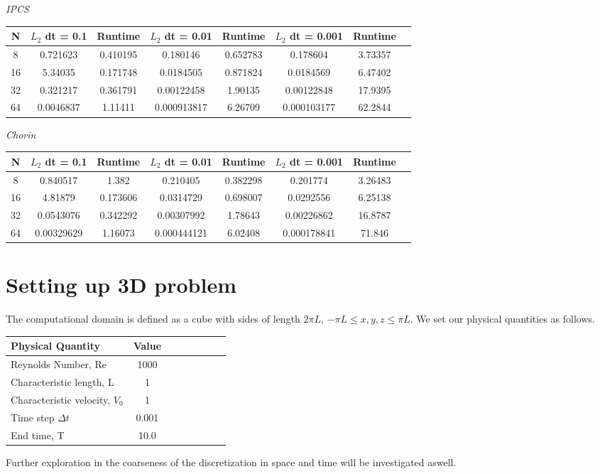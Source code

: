 \documentclass[a4paper,norsk]{article}
\begin{document}
\textit{IPCS}
\begin{table}[ht]
\centering
\begin{tabular}{c|ccccccc}
\hline
\rowcolor{LightCyan}
N  &  $L_2$ dt = 0.1 & Runtime & $L_2$ dt = 0.01 & Runtime  & $L_2$ dt = 0.001  & Runtime\\
\hline
8  & 0.721623  & 0.410195 & 0.180146    & 0.652783 & 0.178604    & 3.73357 \\ \hline
\rowcolor{LightCyan}
16 & 5.34035   & 0.171748 & 0.0184505   & 0.871824 & 0.0184569   & 6.47402 \\ \hline
32 & 0.321217  & 0.361791 & 0.00122458  & 1.90135  & 0.00122848  & 17.9395 \\ \hline
\rowcolor{LightCyan}
64 & 0.0046837 & 1.11411  & 0.000913817 & 6.26709  & 0.000103177 & 62.2844 \\
\hline
\end{tabular}
\end{table}

\textit{Chorin}

\begin{table}[ht]
\centering
\begin{tabular}{c|ccccccc}
\hline
\rowcolor{LightCyan}
N  &  $L_2$ dt = 0.1 & Runtime & $L_2$ dt = 0.01 & Runtime  & $L_2$ dt = 0.001  & Runtime\\
\hline
8  & 0.840517   & 1.382    & 0.210405    & 0.382298 & 0.201774    & 3.26483 \\ \hline
\rowcolor{LightCyan}
16 & 4.81879    & 0.173606 & 0.0314729   & 0.698007 & 0.0292556   & 6.25138 \\ \hline
32 & 0.0543076  & 0.342292 & 0.00307992  & 1.78643  & 0.00226862  & 16.8787 \\ \hline
\rowcolor{LightCyan}
64 & 0.00329629 & 1.16073  & 0.000444121 & 6.02408  & 0.000178841 & 71.846 \\ 
\hline
\end{tabular}
\end{table}

\newpage
\section*{Setting up 3D problem}
The computational domain is defined as a cube with sides of length $2 \pi L$, $-\pi L \leq x,y,z \leq \pi L$. We set our 
physical quantities as follows. 

\begin{tabular}{l*{6}{c}r}
Physical Quantity              & Value  \\
\hline
Reynolds Number, Re & 1000   \\
Characteristic length, L           & 1     \\
Characteristic velocity, $V_{0}$   & 1     \\
Time step $\Delta t$ 			   & 0.001 \\
End time, T 					   & 10.0
\end{tabular}
Further exploration in the coarseness of the discretization in space and time will be investigated aswell.
\end{document}
